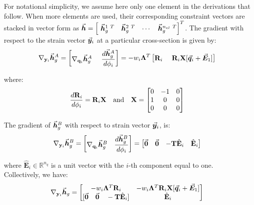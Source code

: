 \begin{appendices}
\noindent For notational simplicity, we assume here only one element
in the derivations that follow. When more elements are used, their
corresponding constraint vectors are stacked in vector form as
$\vec{\bm{h}} = \begin{bmatrix}
	\ \vec{\bm{h}}_g^{1\ T}& \vec{\bm{h}}_g^{2\ T}& \cdots & \vec{\bm{h}}_g^{n_{el}\ T}
\end{bmatrix}^T$.
The gradient with respect to the strain vector
$\vec{\bm{y}}_i$ at a particular cross-section is given by:
\begin{gather}
	\nabla_{\mathbf{y}_i}\vec{\bm{h}}_g^A = \begin{bmatrix}
		\nabla_{\mathbf{q}_i}\vec{\bm{h}}_g^A &\ \dfrac{d \vec{\bm{h}}_g^A}{d\phi_i}
	\end{bmatrix} = -w_i\mathbf{\Lambda}^T\begin{bmatrix}
		\mathbf{R}_i &\
		\mathbf{R}_i\mathbf{X}[\vec{\bm{q}}_i+\vec{\bm{E}}_1]
	\end{bmatrix}\nonumber
\end{gather}

\noindent where:
\begin{gather}
	\frac{d\mathbf{R}_i}{d\phi_i} = \mathbf{R}_i\mathbf{X}\quad\text{and}\quad
	\mathbf{X} = \begin{bmatrix}
		0 & -1 & 0\\
		1 &  0 & 0\\
		0 &  0 & 0
	\end{bmatrix}\nonumber
\end{gather}

\noindent The gradient of $\vec{\bm{h}}_g^B$ with respect to strain vector
$\vec{\bm{y}}_i$, is:
\begin{gather}
	\nabla_{\mathbf{y}_i}\vec{\bm{h}}_g^B = \begin{bmatrix}
		\nabla_{\mathbf{q}_i}\vec{\bm{h}}_g^B & \dfrac{d \vec{\bm{h}}_g^B}{d\phi_i}
	\end{bmatrix} = \begin{bmatrix}
		\vec{\bm{0}} & \vec{\bm{0}} & -\mathbf{T}\hat{\mathbf{E}}_i & \hat{\mathbf{E}}_i
	\end{bmatrix}\nonumber
\end{gather}

\noindent where $\hat{\mathbf{E}}_i\in\mathbb{R}^{n_q}$ is a unit vector with 
the
$i$-th component equal to one.
\noindent Collectively, we have:
\begin{gather}
	\nabla_{\mathbf{y}_i}\bvec{h}_g = \begin{bmatrix}
		-w_i\bmat{\Lambda}^T\bmat{R}_i & -w_i\bmat{\Lambda}^T
		\bmat{R}_i\bmat{X}[\bvec{q}_i+\bvec{E}_1]\\
		[\bvec{0}\quad \bvec{0}\quad -\bmat{T}\hat{\mathbf{E}}_i] & 
		\hat{\mathbf{E}}_i
	\end{bmatrix}
	\label{eq:con1}
\end{gather}


\end{appendices}
